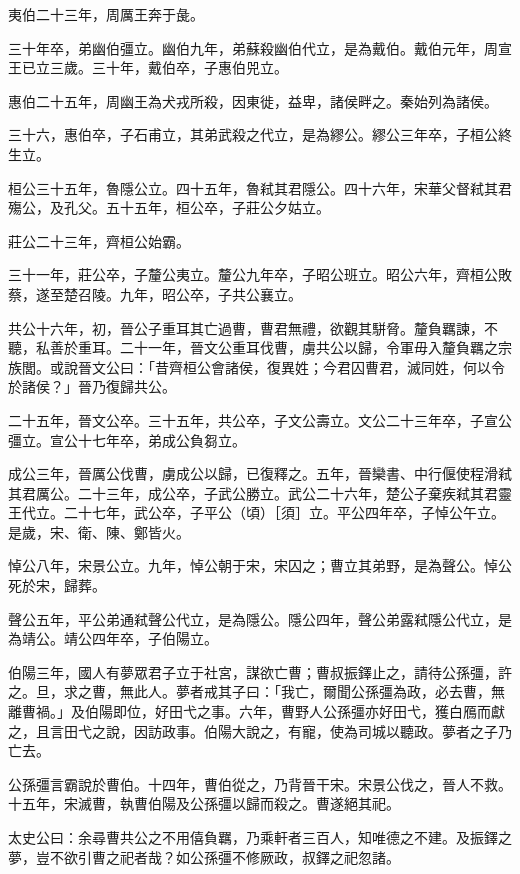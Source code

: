 \begin{pinyinscope}
夷伯二十三年，周厲王奔于彘。

三十年卒，弟幽伯彊立。幽伯九年，弟蘇殺幽伯代立，是為戴伯。戴伯元年，周宣王已立三歲。三十年，戴伯卒，子惠伯兕立。

惠伯二十五年，周幽王為犬戎所殺，因東徙，益卑，諸侯畔之。秦始列為諸侯。

三十六，惠伯卒，子石甫立，其弟武殺之代立，是為繆公。繆公三年卒，子桓公終生立。

桓公三十五年，魯隱公立。四十五年，魯弒其君隱公。四十六年，宋華父督弒其君殤公，及孔父。五十五年，桓公卒，子莊公夕姑立。

莊公二十三年，齊桓公始霸。

三十一年，莊公卒，子釐公夷立。釐公九年卒，子昭公班立。昭公六年，齊桓公敗蔡，遂至楚召陵。九年，昭公卒，子共公襄立。

共公十六年，初，晉公子重耳其亡過曹，曹君無禮，欲觀其駢脅。釐負羈諫，不聽，私善於重耳。二十一年，晉文公重耳伐曹，虜共公以歸，令軍毋入釐負羈之宗族閭。或說晉文公曰：「昔齊桓公會諸侯，復異姓；今君囚曹君，滅同姓，何以令於諸侯？」晉乃復歸共公。

二十五年，晉文公卒。三十五年，共公卒，子文公壽立。文公二十三年卒，子宣公彊立。宣公十七年卒，弟成公負芻立。

成公三年，晉厲公伐曹，虜成公以歸，已復釋之。五年，晉欒書、中行偃使程滑弒其君厲公。二十三年，成公卒，子武公勝立。武公二十六年，楚公子棄疾弒其君靈王代立。二十七年，武公卒，子平公（頃）［須］立。平公四年卒，子悼公午立。是歲，宋、衛、陳、鄭皆火。

悼公八年，宋景公立。九年，悼公朝于宋，宋囚之；曹立其弟野，是為聲公。悼公死於宋，歸葬。

聲公五年，平公弟通弒聲公代立，是為隱公。隱公四年，聲公弟露弒隱公代立，是為靖公。靖公四年卒，子伯陽立。

伯陽三年，國人有夢眾君子立于社宮，謀欲亡曹；曹叔振鐸止之，請待公孫彊，許之。旦，求之曹，無此人。夢者戒其子曰：「我亡，爾聞公孫彊為政，必去曹，無離曹禍。」及伯陽即位，好田弋之事。六年，曹野人公孫彊亦好田弋，獲白鴈而獻之，且言田弋之說，因訪政事。伯陽大說之，有寵，使為司城以聽政。夢者之子乃亡去。

公孫彊言霸說於曹伯。十四年，曹伯從之，乃背晉干宋。宋景公伐之，晉人不救。十五年，宋滅曹，執曹伯陽及公孫彊以歸而殺之。曹遂絕其祀。

太史公曰：余尋曹共公之不用僖負羈，乃乘軒者三百人，知唯德之不建。及振鐸之夢，豈不欲引曹之祀者哉？如公孫彊不修厥政，叔鐸之祀忽諸。


\end{pinyinscope}
